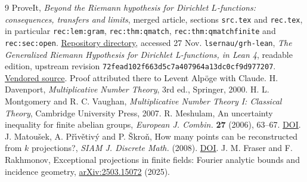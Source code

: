 \documentclass[11pt]{article}
\theoremstyle{remark}\newtheorem{remark}[theorem]{Remark}
\newcommand{\1}{\mathbf 1}
\begin{document}
\begin{thebibliography}{9}
 ProveIt, \emph{Beyond the Riemann hypothesis for Dirichlet $L$-functions: consequences, transfers and limits}, merged article, sections \texttt{src.tex} and \texttt{rec.tex}, in particular \texttt{rec:lem:gram}, \texttt{rec:thm:qmatch}, \texttt{rec:thm:qmatchfinite} and \texttt{rec:sec:open}. \href{https://github.com/VladimirReshetnikov/ProveIt/tree/main/Analysis/GeneralizedRiemannHypothesis/Article}{Repository directory}, accessed 27 Nov.
 \texttt{lsernau/grh-lean}, \emph{The Generalized Riemann Hypothesis for Dirichlet L-functions, in Lean 4}, readable edition, upstream revision \texttt{72fead102f663d5c7a407964a13dc0cf9d977207}. \href{https://github.com/VladimirReshetnikov/ProveIt/tree/main/Analysis/GeneralizedRiemannHypothesis/vendor/grh-lean}{Vendored source}. Proof attributed there to Levent Alp\"oge with Claude.
 H. Davenport, \emph{Multiplicative Number Theory}, 3rd ed., Springer, 2000.
 H. L. Montgomery and R. C. Vaughan, \emph{Multiplicative Number Theory I: Classical Theory}, Cambridge University Press, 2007.
 R. Meshulam, An uncertainty inequality for finite abelian groups, \emph{European J. Combin.} \textbf{27} (2006), 63--67. \href{https://doi.org/10.1016/j.ejc.2004.07.009}{DOI}.
 J. Matou\v{s}ek, A. P\v{r}\'\i v\v{e}tiv\'y and P. \v{S}kro\v{n}, How many points can be reconstructed from $k$ projections?, \emph{SIAM J. Discrete Math.} (2008). \href{https://doi.org/10.1137/080715706}{DOI}.
 J. M. Fraser and F. Rakhmonov, Exceptional projections in finite fields: Fourier analytic bounds and incidence geometry, \href{https://arxiv.org/abs/2503.15072}{arXiv:2503.15072} (2025).
\end{thebibliography}
\end{document}
